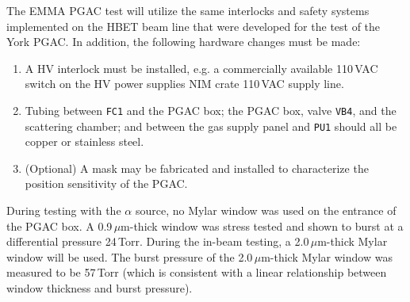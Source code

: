 The EMMA PGAC test will utilize the same interlocks and safety systems implemented on the HBET beam line that were developed for the test of the York PGAC.  In addition, 
the following hardware changes must be made:
\begin{enumerate}
\setlength{\itemsep}{0pt}
\setlength{\parskip}{0pt}
\setlength{\parsep}{0pt}
\item A HV interlock must be installed, e.g. a commercially available 110\,VAC switch on the HV power supplies
 NIM crate 110\,VAC supply line.
\item Tubing between \texttt{FC1} and the PGAC box; the PGAC box, valve \texttt{VB4}, and the scattering chamber; and between
the gas supply panel and \texttt{PU1} should all be copper or stainless steel.
\item (Optional) A mask may be fabricated and installed to characterize the position sensitivity of the PGAC.
\end{enumerate}

During testing with the $\alpha$ source, no Mylar window was used on the entrance of the PGAC box.  A 0.9\,$\mu$m-thick window was stress tested and shown to burst at a differential pressure 24\,Torr.  During the in-beam testing, a  2.0\,$\mu$m-thick Mylar window will be used.  
The burst pressure of the 2.0\,$\mu$m-thick Mylar window was measured to be 57\,Torr (which is consistent with a linear relationship between window thickness and burst pressure).

